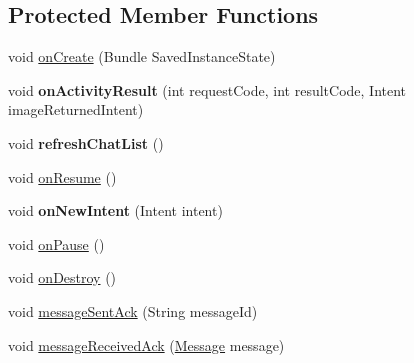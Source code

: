 \subsection*{Protected Member Functions}
\begin{DoxyCompactItemize}
\item 
void \hyperlink{classcom_1_1lbros_1_1epicchat_1_1_view_conversation_activity_a337b563b462074087307bacf992f4cd6}{on\-Create} (Bundle Saved\-Instance\-State)
\item 
\hypertarget{classcom_1_1lbros_1_1epicchat_1_1_view_conversation_activity_a2f753a0594b6da9b13b3270104fe7216}{void {\bfseries on\-Activity\-Result} (int request\-Code, int result\-Code, Intent image\-Returned\-Intent)}\label{classcom_1_1lbros_1_1epicchat_1_1_view_conversation_activity_a2f753a0594b6da9b13b3270104fe7216}

\item 
\hypertarget{classcom_1_1lbros_1_1epicchat_1_1_view_conversation_activity_a9e4ff7f22e215ce625b1adcb8260931f}{void {\bfseries refresh\-Chat\-List} ()}\label{classcom_1_1lbros_1_1epicchat_1_1_view_conversation_activity_a9e4ff7f22e215ce625b1adcb8260931f}

\item 
void \hyperlink{classcom_1_1lbros_1_1epicchat_1_1_view_conversation_activity_a204a6f0baa74bb4a1315b4ca03be96bb}{on\-Resume} ()
\item 
\hypertarget{classcom_1_1lbros_1_1epicchat_1_1_view_conversation_activity_a72ee5f4e05cf494a9908f0dcb9d2de3a}{void {\bfseries on\-New\-Intent} (Intent intent)}\label{classcom_1_1lbros_1_1epicchat_1_1_view_conversation_activity_a72ee5f4e05cf494a9908f0dcb9d2de3a}

\item 
void \hyperlink{classcom_1_1lbros_1_1epicchat_1_1_view_conversation_activity_ab34a6daa6ed4810bbebf72cec959dfa3}{on\-Pause} ()
\item 
void \hyperlink{classcom_1_1lbros_1_1epicchat_1_1_view_conversation_activity_ae05d37b137de0c9ffe62228bfa8da49e}{on\-Destroy} ()
\item 
void \hyperlink{classcom_1_1lbros_1_1epicchat_1_1_view_conversation_activity_a488e9a60731ac46975ee5de8cc4706b8}{message\-Sent\-Ack} (String message\-Id)
\item 
void \hyperlink{classcom_1_1lbros_1_1epicchat_1_1_view_conversation_activity_a4130415c6aed09dfdb4ff4a4e0fadfb7}{message\-Received\-Ack} (\hyperlink{classcom_1_1lbros_1_1epicchat_1_1_message}{Message} message)
\end{DoxyCompactItemize}



